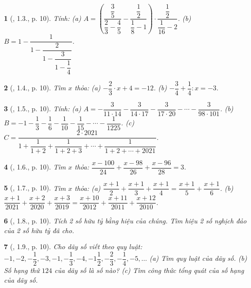 \documentclass{article}
\newtheorem{baitoan}{}
\begin{document}
\begin{baitoan}[\cite{Binh_boi_duong_Toan_7_tap_1}, 1.3., p. 10]
	Tính: (a) $A = \left(\dfrac{\dfrac{3}{5}}{\dfrac{2}{3} - \dfrac{4}{5}} - \dfrac{\dfrac{1}{2}}{\dfrac{1}{8} - 1}\right)\cdot\dfrac{\dfrac{1}{2}}{\dfrac{1}{16} - 2}$. (b) $B = 1 - \dfrac{1}{1 - \dfrac{2}{1 - \dfrac{3}{1 - \dfrac{1}{4}}}}$.
\end{baitoan}

\begin{baitoan}[\cite{Binh_boi_duong_Toan_7_tap_1}, 1.4., p. 10]
	Tìm $x$ thỏa: (a) $-\dfrac{2}{3}\cdot x + 4 = -12$. (b) $-\dfrac{3}{4} + \dfrac{1}{4}:x = -3$.
\end{baitoan}

\begin{baitoan}[\cite{Binh_boi_duong_Toan_7_tap_1}, 1.5., p. 10]
	Tính: (a) $A = -\dfrac{3}{11\cdot14} - \dfrac{3}{14\cdot17} - \dfrac{3}{17\cdot20} - \cdots - \dfrac{3}{98\cdot101}$. (b) $B = -1 - \dfrac{1}{3} - \dfrac{1}{6} - \dfrac{1}{10} - \dfrac{1}{15} - \cdots - \dfrac{1}{1225}$. (c) $C = \dfrac{2\cdot2021}{1 + \dfrac{1}{1 + 2} + \dfrac{1}{1 + 2 + 3} + \cdots + \dfrac{1}{1 + 2 + \cdots + 2021}}$.
\end{baitoan}

\begin{baitoan}[\cite{Binh_boi_duong_Toan_7_tap_1}, 1.6., p. 10]
	Tìm $x$ thỏa: $\dfrac{x - 100}{24} + \dfrac{x - 98}{26} + \dfrac{x - 96}{28} = 3$.
\end{baitoan}

\begin{baitoan}[\cite{Binh_boi_duong_Toan_7_tap_1}, 1.7., p. 10]
	Tìm $x$ thỏa: (a) $\dfrac{x + 1}{2} + \dfrac{x + 1}{3} + \dfrac{x + 1}{4} = \dfrac{x + 1}{5} + \dfrac{x + 1}{6}$. (b) $\dfrac{x + 1}{2021} + \dfrac{x + 2}{2020} + \dfrac{x + 3}{2019} = \dfrac{x + 10}{2012} + \dfrac{x + 11}{2011} + \dfrac{x + 12}{2010}$.
\end{baitoan}

\begin{baitoan}[\cite{Binh_boi_duong_Toan_7_tap_1}, 1.8., p. 10]
	Tích 2 số hữu tỷ bằng hiệu của chúng. Tìm hiệu 2 số nghịch đảo của 2 số hữu tỷ đã cho.
\end{baitoan}

\begin{baitoan}[\cite{Binh_boi_duong_Toan_7_tap_1}, 1.9., p. 10]
	Cho dãy số viết theo quy luật: $-1,-2,-\dfrac{1}{2},-3,-1,-\dfrac{1}{3},-4,-1\dfrac{1}{2},-\dfrac{2}{3},-\dfrac{1}{4},-5,\ldots$ (a) Tìm quy luật của dãy số. (b) Số hạng thứ $124$ của dãy số là số nào? (c) Tìm công thức tổng quát của số hạng của dãy số.
\end{baitoan}
\end{document}
